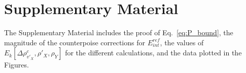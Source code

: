 \documentclass[amsmath,amssymb,preprint,aip,jcp]{revtex4-1}
\begin{document}
\section*{Supplementary Material}
The Supplementary Material includes the proof of Eq.~\ref{eq:P_bound}, the magnitude of the counterpoise corrections for $E_{int}^{ref}$, the values of $E_k[\Delta \rho^{c}_{v'_X}, \rho'_X, \rho_Y]$ for the different calculations, and the data plotted in the Figures.

\end{document}
